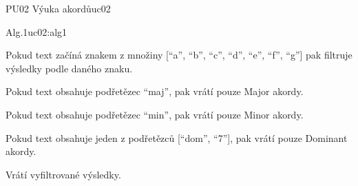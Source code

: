 \begin{usecase}{PU02 Výuka akordů}{uc02}
    \begin{scenario}{Alg.1}{uc02:alg1}
        \item Pokud text začíná znakem z množiny [\enquote{a}, \enquote{b}, \enquote{c}, \enquote{d}, \enquote{e}, \enquote{f}, \enquote{g}] pak filtruje výsledky podle daného znaku.
        \item Pokud text obsahuje podřetězec \enquote{maj}, pak vrátí pouze Major akordy.
        \item Pokud text obsahuje podřetězec \enquote{min}, pak vrátí pouze Minor akordy.
        \item Pokud text obsahuje jeden z podřetězců [\enquote{dom}, \enquote{7}], pak vrátí pouze Dominant akordy.
        \item Vrátí vyfiltrované výsledky.
    \end{scenario}
\end{usecase}